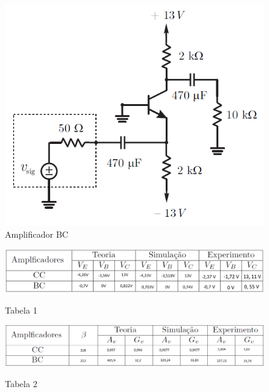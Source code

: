 \documentclass[journal, a4paper]{IEEEtran}
\begin{document}
            \begin{figure}[H]
        		\begin{center}
        		\includegraphics[width=\columnwidth]{circuito2.png}
        		\caption{Amplificador BC}
        		\label{circuito2}
        		\end{center}
        	\end{figure}  
            
            \begin{figure}[H]
        		\begin{center}
        		\caption{Tabela 1}
        		\includegraphics[width=\columnwidth]{tabela11.png}
        		\label{tabela1}
        		\end{center}
        	\end{figure}  
            
            \begin{figure}[H]
        		\begin{center}
        		\caption{Tabela 2}
        		\includegraphics[width=\columnwidth]{tabela12.png}
        		\label{tabela2}
        		\end{center}
        	\end{figure}  
        
\end{document}
